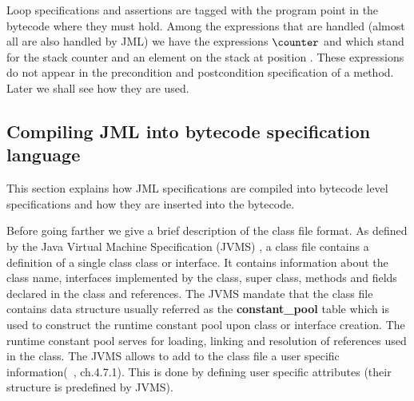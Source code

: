 Loop specifications and assertions are tagged with the program point in the bytecode where they must hold. Among the expressions that are handled (almost all are also handled
by JML) we have the expressions $\counter$ and \stack{\ArithExpr} which  stand for the stack counter and an element on the stack at position \ArithExpr. These expressions do not appear in the precondition and postcondition specification of a method. Later we shall see how they are used.
 
 
\subsection{Compiling JML into bytecode specification language}\label{comJML}

This section explains how JML specifications are compiled into bytecode level specifications and how they are inserted into the bytecode. 
 
Before going farther we give a brief description of the class file format. As defined by the Java Virtual Machine Specification (JVMS) \cite{VMSpec}, a class file contains a definition of a single class class or interface. It contains information about the class name, interfaces implemented by the class, super class, methods and fields declared in the class and references. The JVMS mandate that the class file contains data structure usually referred as the \textbf{constant\_pool} table which is used to construct the runtime constant pool upon class or interface creation. The runtime constant pool serves for loading, linking and resolution of references used in the class. The JVMS allows to add to the class file a user specific information(~\cite{VMSpec}, ch.4.7.1). This is done by defining user specific attributes  (their structure is predefined by JVMS).

